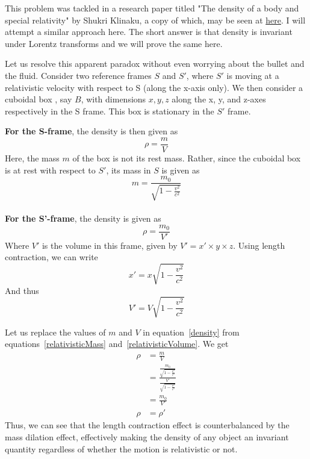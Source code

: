 This problem was tackled in a research paper titled "The density of a body and special relativity" by Shukri Klinaku, a copy of which, may be seen at \href{https://www.researchgate.net/publication/283213614_The_Density_of_a_Body_and_Special_Relativity}{here}. I will attempt a similar approach here. The short answer is that density is invariant under Lorentz transforms and we will prove the same here.

Let us resolve this apparent paradox without even worrying about the bullet and the fluid. Consider two reference frames $S$ and $S'$, where $S'$ is moving at a relativistic velocity with respect to  S (along the x-axis only). We then consider a cuboidal box , say $B$, with dimensions $x,y,z$ along the x, y, and z-axes respectively in the S frame. This box is stationary in the $S'$ frame.

\textbf{For the S-frame}, the density is then given as 
\begin{equation}
    \rho = \frac{m}{V}
    \label{density}
\end{equation}
Here, the mass $m$ of the box is not its rest mass. Rather, since the cuboidal box is at rest with respect to $S'$, its mass in $S$ is given as 
\begin{equation}
    m = \frac{m_0}{\sqrt{1-\frac{v^2}{c^2}}}
    \label{relativisticMass}
\end{equation}\\
\textbf{For the S'-frame}, the density is given as $$\rho = \frac{m_0}{V'}$$
Where $V'$ is the volume in this frame, given by $V' = x' \times y \times z$. Using length contraction, we can write
\begin{equation}
    x' = x \sqrt{1-\frac{v^2}{c^2}}
\end{equation}
And thus
\begin{equation}
    V' = V \sqrt{1-\frac{v^2}{c^2}}
    \label{relativisticVolume}
\end{equation}


Let us replace the values of $m$ and $V$ in equation~\ref{density} from equations~\ref{relativisticMass} and~\ref{relativisticVolume}. We get
\begin{align*}
    \rho &= \frac{m}{V}\\
            &= \frac{\frac{m_0}{\sqrt{1-\frac{v^2}{c^2}}}}{\frac{V'}{\sqrt{1-\frac{v^2}{c^2}}}}\\
            &= \frac{m_0}{V'}\\
    \rho &= \rho '
\end{align*}
Thus, we can see that the length contraction effect is counterbalanced by the mass dilation effect, effectively making the density of any object an invariant quantity regardless of whether the motion is relativistic or not. 
